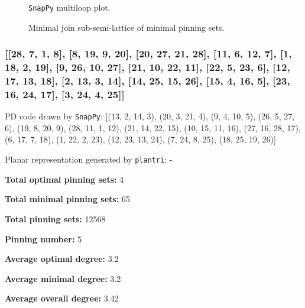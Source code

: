 \documentclass{article}%
\begin{document}
\begin{multicols}{2}
\begin{figure}[H]
\centering

\caption{\texttt{SnapPy} multiloop plot.}
\label{fig:tex/img/[[17, 28, 18, 1], [16, 7, 17, 8], [27, 6, 28, 7], [18, 23, 19, 24], [1, 24, 2, 25], [8, 25, 9, 26], [26, 15, 27, 16], [10, 5, 11, 6], [11, 22, 12, 23], [19, 3, 20, 2], [9, 14, 10, 15], [21, 4, 22, 5],.svg}
\end{figure}
\columnbreak

\begin{figure}[H]
\centering
\scalebox{0.8}{}
\caption{Minimal join sub-semi-lattice of minimal pinning sets.}
\label{fig:tex/img/[[17, 28, 18, 1], [16, 7, 17, 8], [27, 6, 28, 7], [18, 23, 19, 24], [1, 24, 2, 25], [8, 25, 9, 26], [26, 15, 27, 16], [10, 5, 11, 6], [11, 22, 12, 23], [19, 3, 20, 2], [9, 14, 10, 15], [21, 4, 22, 5],.pgf}
\end{figure}
\end{multicols}

\newpage

\subsubsection{[[28, 7, 1, 8], [8, 19, 9, 20], [20, 27, 21, 28], [11, 6, 12, 7], [1, 18, 2, 19], [9, 26, 10, 27], [21, 10, 22, 11], [22, 5, 23, 6], [12, 17, 13, 18], [2, 13, 3, 14], [14, 25, 15, 26], [15, 4, 16, 5], [23, 16, 24, 17], [3, 24, 4, 25]]}

{\small\noindent PD code drawn by \texttt{SnapPy}: [(13, 2, 14, 3), (20, 3, 21, 4), (9, 4, 10, 5), (26, 5, 27, 6), (19, 8, 20, 9), (28, 11, 1, 12), (21, 14, 22, 15), (10, 15, 11, 16), (27, 16, 28, 17), (6, 17, 7, 18), (1, 22, 2, 23), (12, 23, 13, 24), (7, 24, 8, 25), (18, 25, 19, 26)]}

{\small\noindent Planar representation generated by \texttt{plantri}: -}

\begin{multicols}{2}
{\normalsize \noindent\textbf{Total optimal pinning sets:} 4

\noindent\textbf{Total minimal pinning sets:} 65

\noindent\textbf{Total pinning sets:} 12568

\noindent\textbf{Pinning number:} 5

}
\columnbreak

{\normalsize \noindent\textbf{Average optimal degree:} 3.2

\noindent\textbf{Average minimal degree:} 3.2

\noindent\textbf{Average overall degree:} 3.42

}
\end{multicols}
\end{document}
